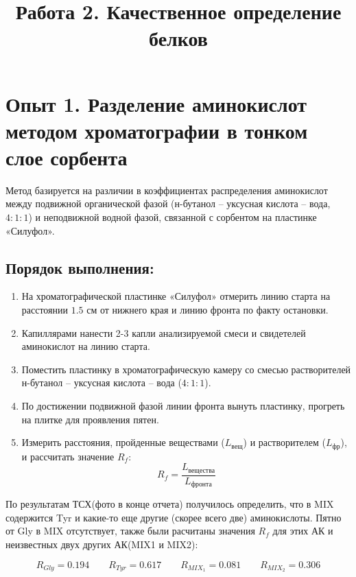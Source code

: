 \documentclass[a4paper,12pt]{article}
\title{\textbf{Работа 2. Качественное определение белков}}\\
\begin{document}
\maketitle

\section*{Опыт 1. Разделение аминокислот методом хроматографии в тонком слое сорбента}

Метод базируется на различии в коэффициентах распределения аминокислот между подвижной органической фазой (н-бутанол -- уксусная кислота -- вода, $4:1:1$) и неподвижной водной фазой, связанной с сорбентом на пластинке «Силуфол».

\subsection*{Порядок выполнения:}
\begin{enumerate}
    \item На хроматографической пластинке «Силуфол» отмерить линию старта на расстоянии $1.5\text{ см}$ от нижнего края и линию фронта по факту остановки.
    \item Капиллярами нанести 2-3 капли анализируемой смеси и свидетелей аминокислот на линию старта.
    \item Поместить пластинку в хроматографическую камеру со смесью растворителей н-бутанол -- уксусная кислота -- вода ($4:1:1$).
    \item По достижении подвижной фазой линии фронта вынуть пластинку, прогреть на плитке для проявления пятен.
    \item Измерить расстояния, пройденные веществами ($L_{\text{вещ}}$) и растворителем ($L_{\text{фр}}$), и рассчитать значение $R_f$:
    \begin{equation}
    R_f = \frac{L_{\text{вещества}}}{L_{\text{фронта}}}
    \end{equation}
\end{enumerate}

По результатам ТСХ(фото в конце отчета) получилось определить, что в MIX содержится Tyr и какие-то еще другие (скорее всего две) аминокислоты. Пятно от Gly в MIX отсутствует, также были расчитаны значения $R_f$ для этих АК и неизвестных двух других АК(MIX1 и MIX2):

\begin{equation}
R_{Gly} = 0.194 \qquad  R_{Tyr} = 0.617 \qquad R_{MIX_1} = 0.081 \qquad  R_{MIX_2} = 0.306
\end{equation}
\end{document}
